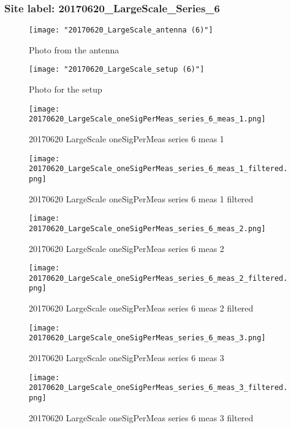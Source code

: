 \subsubsection{Site label: 20170620\_LargeScale\_Series\_6}
\begin{figure}[ht] \caption{Photo from the antenna}
\texttt{[image: "20170620\_LargeScale\_antenna (6)"]}\centering\end{figure}
\begin{figure}[ht] \caption{Photo for the setup}
\texttt{[image: "20170620\_LargeScale\_setup (6)"]}\centering\end{figure}
\begin{figure}[ht] \caption{20170620 LargeScale oneSigPerMeas series 6 meas 1}
\texttt{[image: 20170620\_LargeScale\_oneSigPerMeas\_series\_6\_meas\_1.png]}\centering\end{figure}
\begin{figure}[ht] \caption{20170620 LargeScale oneSigPerMeas series 6 meas 1 filtered}
\texttt{[image: 20170620\_LargeScale\_oneSigPerMeas\_series\_6\_meas\_1\_filtered.png]}\centering\end{figure}
\begin{figure}[ht] \caption{20170620 LargeScale oneSigPerMeas series 6 meas 2}
\texttt{[image: 20170620\_LargeScale\_oneSigPerMeas\_series\_6\_meas\_2.png]}\centering\end{figure}
\begin{figure}[ht] \caption{20170620 LargeScale oneSigPerMeas series 6 meas 2 filtered}
\texttt{[image: 20170620\_LargeScale\_oneSigPerMeas\_series\_6\_meas\_2\_filtered.png]}\centering\end{figure}
\begin{figure}[ht] \caption{20170620 LargeScale oneSigPerMeas series 6 meas 3}
\texttt{[image: 20170620\_LargeScale\_oneSigPerMeas\_series\_6\_meas\_3.png]}\centering\end{figure}
\begin{figure}[ht] \caption{20170620 LargeScale oneSigPerMeas series 6 meas 3 filtered}
\texttt{[image: 20170620\_LargeScale\_oneSigPerMeas\_series\_6\_meas\_3\_filtered.png]}\centering\end{figure}
\clearpage
